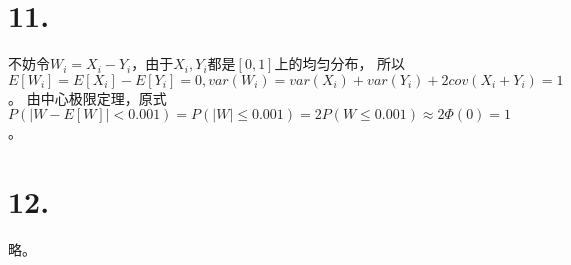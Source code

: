 \documentclass[UTF8]{report}
\begin{document}
    \section*{11.}
        不妨令$W_i = X_i - Y_i$，由于$X_i, Y_i$都是$[0, 1]$上的均匀分布，
        所以$E[W_i] = E[X_i] - E[Y_i] = 0,
        var(W_i) = var(X_i) + var(Y_i) + 2cov(X_i + Y_i) = 1$。
        由中心极限定理，原式$P(|W - E[W]| < 0.001) = P(|W| \leq 0.001)
        = 2P(W \leq 0.001) \approx 2\Phi(0) = 1$。
    \section*{12.}
        略。
\end{document}
